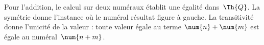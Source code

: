 \documentclass[../../../include/open-logic-section]{subfiles}
\begin{document}
\begin{explain}
Pour l'addition, le calcul sur deux numéraux établit une
égalité dans~$\Th{Q}$. La symétrie donne l'instance où le
numéral résultat figure à gauche. La transitivité donne
l'unicité de la valeur : toute valeur égale au terme
$\num{n}+\num{m}$ est égale au numéral~$\num{n+m}$.
\end{explain}
\end{document}

